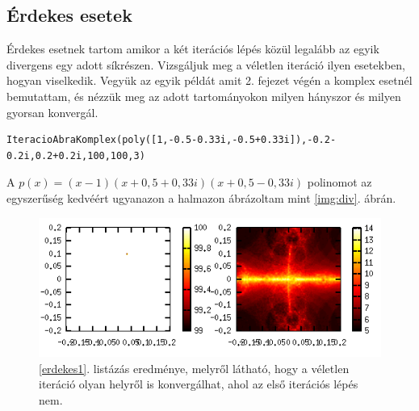 \documentclass[a4paper,12pt]{report}
\begin{document}
			\subsection{Érdekes esetek}
				Érdekes esetnek tartom amikor a két iterációs lépés közül legalább az egyik divergens egy adott síkrészen. Vizsgáljuk meg a véletlen iteráció ilyen esetekben, hogyan viselkedik. Vegyük az egyik példát amit 2. fejezet végén a komplex esetnél bemutattam, és nézzük meg az adott tartományokon milyen hányszor és milyen gyorsan konvergál.
               	\begin{singlespace}
                \begin{lstlisting}[caption=Bemenet,label=erdekes1]
IteracioAbraKomplex(poly([1,-0.5-0.33i,-0.5+0.33i]),-0.2-0.2i,0.2+0.2i,100,100,3)
                \end{lstlisting}
                \end{singlespace}
                A $p(x) = (x-1)(x+0,\!5+0,\!33i)(x+0,\!5-0,\!33i)$ polinomot az egyszerűség kedvéért ugyanazon a halmazon ábrázoltam mint \ref{img:div}. ábrán. 
                
               			 \begin{figure}[h!]
					\centering
					\includegraphics[scale=0.7]{erdekes.png}
					\caption{\ref{erdekes1}. listázás eredménye, melyről látható, hogy a véletlen iteráció olyan helyről is konvergálhat, ahol az első iterációs lépés nem.}
				\end{figure}
                
\end{document}
